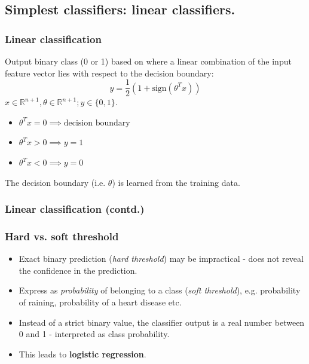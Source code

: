 \documentclass{beamer}
\begin{document}
\begin{frame}
\section{Simplest classifiers: linear classifiers.}
\end{frame}

\begin{frame}
\frametitle{Linear classification}
Output binary class (0 or 1) based on where a linear combination of the input feature vector lies with respect to the decision boundary:
\begin{equation}
y = \frac{1}{2}(1 + \text{sign} (\theta^T x))
\end{equation}
$x \in \mathds{R}^{n+1}, \theta \in \mathds{R}^{n+1}; y \in \{0,1\}.$\\

\begin{itemize}
\item $ \theta^T x = 0 \implies \text{decision boundary}$
\item $ \theta^T x > 0 \implies y = 1$
\item $ \theta^T x  < 0 \implies y = 0$
\end{itemize}


The decision boundary (i.e. $\theta$) is learned from the training data.
\end{frame}

\begin{frame}
\frametitle{Linear classification (contd.)}
\end{frame}

\begin{frame}
\frametitle{Hard vs. soft threshold}
\begin{itemize}
\item Exact binary prediction (\textit{hard threshold}) may be impractical - does not reveal the confidence in the prediction.
\item Express as \textit{probability} of belonging to a class (\textit{soft threshold}), e.g. probability of raining, probability of a heart disease etc. \item Instead of a strict binary value, the classifier output is a real number between 0 and 1 - interpreted as class probability.
\item This leads to \textbf{logistic regression}.
\end{itemize}
\end{frame}
\end{document}
